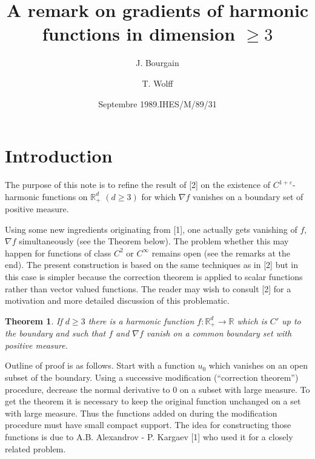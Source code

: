 \documentclass[11pt,reqno]{amsart}
\newtheorem*{thm}{Theorem}
\newcommand{\Rd}{\mathbb{R}^d_+}
\begin{document}
\title{A remark on gradients of harmonic functions in dimension $\geq 3$}
\author{J. Bourgain}
\address{IHES}
\author{T. Wolff}
\address{California Institute of Technology}
\date{Septembre 1989.\quad IHES/M/89/31}
\maketitle

\section*{Introduction}

The purpose of this note is to refine the result of [2] on the existence of
$C^{1+\varepsilon}$-harmonic functions on $\Rd$ $(d\geq 3)$ for which $\nabla f$
vanishes on a boundary set of positive measure.

Using some new ingredients originating from [1], one actually gets vanishing of
$f$, $\nabla f$ simultaneously (see the Theorem below).  The problem whether this
may happen for functions of class $C^2$ or $C^\infty$ remains open (see the
remarks at the end).  The present construction is based on the same techniques as
in [2] but in this case is simpler because the correction theorem is applied to
scalar functions rather than vector valued functions.  The reader may wish to
consult [2] for a motivation and more detailed discussion of this problematic.

\begin{thm}
If $d\geq 3$ there is a harmonic function $f:\Rd\to\mathbb{R}$ which is $C'$ up to
the boundary and such that $f$ and $\nabla f$ vanish on a common boundary set with
positive measure.
\end{thm}

Outline of proof is as follows.  Start with a function $u_0$ which vanishes on an
open subset of the boundary.  Using a successive modification (``correction
theorem'') procedure, decrease the normal derivative to $0$ on a subset with large
measure.  To get the theorem it is necessary to keep the original function
unchanged on a set with large measure.  Thus the functions added on during the
modification procedure must have small compact support.  The idea for constructing
those functions is due to A.B. Alexandrov - P. Kargaev [1] who used it for a
closely related problem.
\end{document}
